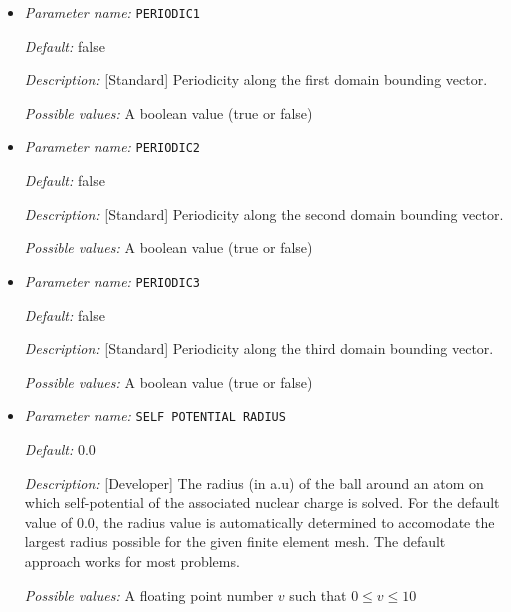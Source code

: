 \begin{itemize}
\item {\it Parameter name:} {\tt PERIODIC1}
\label{parameters:Boundary conditions/PERIODIC1}
\label{parameters:Boundary_20conditions/PERIODIC1}




{\it Default:} false


{\it Description:} [Standard] Periodicity along the first domain bounding vector.


{\it Possible values:} A boolean value (true or false)
\item {\it Parameter name:} {\tt PERIODIC2}
\label{parameters:Boundary conditions/PERIODIC2}
\label{parameters:Boundary_20conditions/PERIODIC2}




{\it Default:} false


{\it Description:} [Standard] Periodicity along the second domain bounding vector.


{\it Possible values:} A boolean value (true or false)
\item {\it Parameter name:} {\tt PERIODIC3}
\label{parameters:Boundary conditions/PERIODIC3}
\label{parameters:Boundary_20conditions/PERIODIC3}




{\it Default:} false


{\it Description:} [Standard] Periodicity along the third domain bounding vector.


{\it Possible values:} A boolean value (true or false)
\item {\it Parameter name:} {\tt SELF POTENTIAL RADIUS}
\label{parameters:Boundary conditions/SELF POTENTIAL RADIUS}
\label{parameters:Boundary_20conditions/SELF_20POTENTIAL_20RADIUS}




{\it Default:} 0.0


{\it Description:} [Developer] The radius (in a.u) of the ball around an atom on which self-potential of the associated nuclear charge is solved. For the default value of 0.0, the radius value is automatically determined to accomodate the largest radius possible for the given finite element mesh. The default approach works for most problems.


{\it Possible values:} A floating point number $v$ such that $0 \leq v \leq 10$
\end{itemize}


